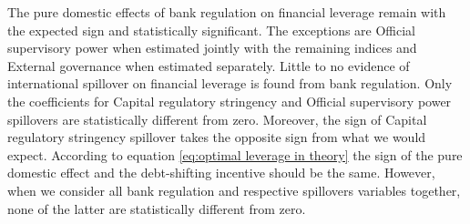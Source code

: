 \documentclass[12pt]{article}
\begin{document}
 The pure domestic effects of bank regulation on financial leverage remain with the expected sign and statistically significant. The exceptions are Official supervisory power when estimated jointly with the remaining indices and External governance when estimated separately.  Little to no evidence of international spillover on financial leverage is found from bank regulation. Only the coefficients for Capital regulatory stringency and Official supervisory power spillovers are statistically different from zero. Moreover, the sign of Capital regulatory stringency spillover takes the opposite sign from what we would expect. According to equation \ref{eq:optimal leverage in theory} the sign of the pure domestic effect and the debt-shifting incentive should be the same. However, when we consider all bank regulation and respective spillovers variables together, none of the latter are statistically different from zero.       
 
\end{document}
